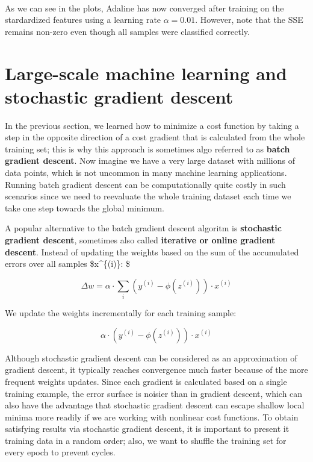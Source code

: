\documentclass[11pt]{article}
\begin{document}
    \begin{center}
    \end{center}
    { \hspace*{\fill} \\}
    
    As we can see in the plots, Adaline has now converged after training on
the stardardized features using a learning rate \(\alpha = 0.01\).
However, note that the SSE remains non-zero even though all samples were
classified correctly.

    \section{Large-scale machine learning and stochastic gradient
descent}\label{large-scale-machine-learning-and-stochastic-gradient-descent}

    In the previous section, we learned how to minimize a cost function by
taking a step in the opposite direction of a cost gradient that is
calculated from the whole training set; this is why this approach is
sometimes algo referred to as \textbf{batch gradient descent}. Now
imagine we have a very large dataset with millions of data points, which
is not uncommon in many machine learning applications. Running batch
gradient descent can be computationally quite costly in such scenarios
since we need to reevaluate the whole training dataset each time we take
one step towards the global minimum.

A popular alternative to the batch gradient descent algoritm is
\textbf{stochastic gradient descent}, sometimes also called
\textbf{iterative or online gradient descent}. Instead of updating the
weights based on the sum of the accumulated errors over all samples
\$x\^{}\{(i)\}: \$

\[\Delta w = \alpha \cdot \sum_i (y^{(i)} - \phi(z^{(i)})) \cdot x^{(i)}\]

We update the weights incrementally for each training sample:

\[\alpha \cdot (y^{(i)} - \phi(z^{(i)})) \cdot x^{(i)}\]

    Although stochastic gradient descent can be considered as an
approximation of gradient descent, it typically reaches convergence much
faster because of the more frequent weights updates. Since each gradient
is calculated based on a single training example, the error surface is
noisier than in gradient descent, which can also have the advantage that
stochastic gradient descent can escape shallow local minima more readily
if we are working with nonlinear cost functions. To obtain satisfying
results via stochastic gradient descent, it is important to present it
training data in a random order; also, we want to shuffle the training
set for every epoch to prevent cycles.
\end{document}
